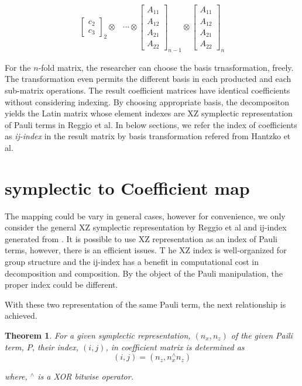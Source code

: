 \documentclass[twocolumn]{article}
\newtheorem{theorem}{Theorem}
\begin{document}
\begin{eqnarray}
\begin{bmatrix}
        c_2\\
        c_3
    \end{bmatrix}_2 \otimes
    &\cdots \otimes
    \begin{bmatrix}
        A_{11} \\
        A_{12} \\
        A_{21} \\
        A_{22}
    \end{bmatrix}_{n-1} \otimes
    \begin{bmatrix}
        A_{11} \\
        A_{12} \\
        A_{21} \\
        A_{22}
    \end{bmatrix}_n\nonumber
\end{eqnarray}

For the $n$-fold matrix, the researcher can choose the basis trnasformation, freely.
The transformation even permits the different basis in each producted and each sub-matrix
operations. The result coefficient matrices have identical coefficients without considering indexing.
By choosing appropriate basis, the decompositon yields the Latin matrix whose element indexes are XZ symplectic representation
of Pauli terms in Reggio et al\cite{reggio_fast_2023}.
In below sections, we refer the index of coefficients as \textit{ij-index} in the result matrix 
by basis transformation refered from Hantzko et al.

\section{symplectic to Coefficient map}

The mapping could be vary in general cases, however for convenience, we only consider
the general XZ symplectic representation by Reggio et al\cite{reggio_fast_2023} and 
ij-index generated from \cite{hantzko_tensorized_2023}.
It is possible to use XZ representation as an index of Pauli terms, 
however, there is an efficient issues.
T he XZ index is well-organized for group structure and 
the ij-index has a benefit in computational cost in decomposition and composition.
By the object of the Pauli manipulation, the proper index could be different.

With these two representation of the same Pauli term, the next relationship is achieved.

\begin{theorem}
    For a given symplectic representation, $(n_x, n_z)$ of the given Paili term, $P$,
    their index, $(i, j)$, in coefficient matrix is determined as 
    $$(i, j) = (n_z, n_x^\wedge n_z)$$

    where, ${}^\wedge$ is a XOR bitwise operator. 
\end{theorem}
\end{document}
